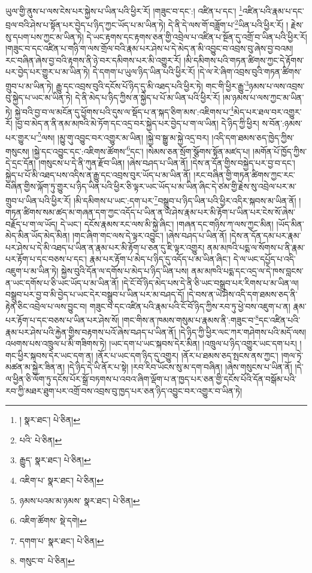 ཡུལ་གྱི་ནུས་པ་ལས་ངེས་པར་སྐྱེས་པ་ཡིན་པའི་ཕྱིར་རོ། །གཟུང་བ་དང་:། འཛིན་པ་དང་། \footnote{།    སྣར་ཐང་།  པེ་ཅིན། }འཛིན་པའི་རྣམ་པ་དང་བྲལ་བའི་ཤེས་པ་སྟོན་པར་བྱེད་པ་ཉིད་ཀྱང་ཡོད་པ་མ་ཡིན་ཏེ། དེ་ནི་དེ་ལས་གོ་བཟློག་པ་\footnote{པའི་  པེ་ཅིན། }ཡིན་པའི་ཕྱིར་རོ། །
རྗེས་སུ་དཔག་པས་ཀྱང་མ་ཡིན་ཏེ། དེ་ཡང་རྟགས་དང་རྟགས་ཅན་གྱི་འབྲེལ་པ་འཛིན་པ་སྔོན་དུ་འགྲོ་བ་ཡིན་པའི་ཕྱིར་རོ། །གཟུང་བ་དང་འཛིན་པ་གཉི་ག་ལས་གྲོལ་བའི་རྣམ་པར་ཤེས་པ་དེ་མེད་ན་མི་འབྱུང་བ་འབྲས་བུ་ཞེས་བྱ་བའམ། རང་བཞིན་ཞེས་བྱ་བའི་རྟགས་ནི་ཉེ་བར་དམིགས་པར་མི་འགྱུར་རོ། །མི་དམིགས་པའི་གཏན་ཚིགས་ཀྱང་དེ་རྟོགས་པར་བྱེད་པར་གྱུར་པ་མ་ཡིན་ཏེ། དེ་དགག་པ་ཡུལ་ཉིད་ཡིན་པའི་ཕྱིར་རོ། །དེ་ལ་རེ་ཞིག་འབྲས་བུའི་གཏན་ཚིགས་གྲུབ་པ་མ་ཡིན་ཏེ། རྒྱུ་དང་འབྲས་བུའི་དངོས་པོ་ཉིད་དུ་མི་འཐད་པའི་ཕྱིར་ཏེ། གང་གི་ཕྱིར་རྒྱུ་\footnote{རྒྱུད་  སྣར་ཐང་།  པེ་ཅིན། }ཉམས་པ་ལས་འབྲས་བུ་སྐྱེད་པ་ཡང་མ་ཡིན་ཏེ། དེ་ནི་མེད་པ་ཉིད་ཀྱིས་ན་སྐྱེད་པ་པོ་མ་ཡིན་པའི་ཕྱིར་རོ། །མ་ཉམས་པ་ལས་ཀྱང་མ་ཡིན་ཏེ། སྐྱེ་བའི་བྱ་བ་ལ་མངོན་དུ་ཕྱོགས་པའི་དུས་ལ་སྡོད་པ་ན་སྐད་ཅིག་མས་:འཇིགས་པ་\footnote{འཇིག་པ་  སྣར་ཐང་།  པེ་ཅིན། }མེད་པར་ཐལ་བར་འགྱུར་རོ། །བྱ་བ་མེད་ན་ནི་ནམ་མཁའི་མེ་ཏོག་དང་འདྲ་བར་སྐྱེད་པར་བྱེད་པ་ག་ལ་ཡིན། དེ་ཉིད་ཀྱི་ཕྱིར། ས་བོན་:ཉམས་པར་གྱུར་པ་\footnote{ཉམས་པའམ་མ་ཉམས་  སྣར་ཐང་།  པེ་ཅིན། }ལས། །མྱུ་གུ་འབྱུང་བར་འགྱུར་མ་ཡིན། །སྐྱེ་བ་སྒྱུ་མ་སྐྱེ་འདྲ་བར། །འདི་དག་ཐམས་ཅད་ཁྱེད་ཀྱིས་གསུངས། །སྐྱེ་དང་འབྱུང་དང་:འཇིགས་ཚོགས་\footnote{འཇིག་ཚོགས་  སྡེ་དགེ། }དང་། །སེམས་ཅན་སྲོག་སྩོགས་སྟོན་མཛད་པ། །མགོན་པོ་ཁྱོད་ཀྱིས་དེ་དྲང་དོན། །གསུངས་པ་དེ་ནི་ཀུན་རྫོབ་ཡིན། །ཞེས་བཤད་པ་ཡིན་ནོ། །དེས་ན་དོན་གྱིས་བསྐྱེད་པར་བྱ་བ་དང་། སྐྱེད་པ་པོ་མི་འཐད་པས་འདིས་ན་རྒྱུ་དང་འབྲས་བུར་ཡོད་པ་མ་ཡིན་ནོ། །རང་བཞིན་གྱི་གཏན་ཚིགས་ཀྱང་རང་བཞིན་གྱིས་ལྐོག་ཏུ་གྱུར་པ་ཉིད་ཡིན་པའི་ཕྱིར་ཅི་ལྟར་ཡང་ཡོད་པ་མ་ཡིན་ཞིང་དེ་ཙམ་གྱི་རྗེས་སུ་འབྲེལ་པར་མ་གྲུབ་པ་ཡིན་པའི་ཕྱིར་རོ། །མི་དམིགས་པ་ཡང་:དག་པར་\footnote{དགག་པ་  སྣར་ཐང་།  པེ་ཅིན། }བསྒྲུབ་པ་ཉིད་ཡིན་པའི་ཕྱིར་འདིར་སྐབས་མ་ཡིན་ནོ། །གཏན་ཚིགས་སམ་ཚད་མ་གཞན་དག་ཀྱང་འདོད་པ་ཡིན་ན་ཡེ་ཤེས་རྣམ་པར་མི་རྟོག་པ་ཡིན་པར་ངེས་སོ་ཞེས་བརྗོད་པ་ག་ལ་ཡོད། དེ་ཡང་། དངོས་རྣམས་རང་ལས་མི་སྐྱེ་ཞིང་། །གཞན་དང་གཉིས་ཀ་ལས་ཀྱང་མིན། །ཡོད་མིན་མེད་མིན་ཡོད་མེད་མིན། །གང་ཞིག་གང་ལས་དེ་ལྟར་འབྱུང་། །ཞེས་བཤད་པ་ཡིན་ནོ། །དེས་ན་དོན་དམ་པར་རྣམ་པར་ཤེས་པ་དེ་མི་འཐད་པ་ཡིན་ན་རྣམ་པར་མི་རྟོག་པ་ཅན་དུ་ཇི་ལྟར་འགྱུར། ནམ་མཁའི་པདྨ་ལ་སོགས་པ་ནི་རྣམ་པར་རྟོག་པ་དང་བཅས་པ་དང་། རྣམ་པར་རྟོག་པ་མེད་པ་ཉིད་དུ་འདོད་པ་མ་ཡིན་ཞིང་། དེ་ལ་ཡང་དཔྱོད་པ་འདི་འཇུག་པ་མ་ཡིན་ཏེ། སྐྱེས་བུའི་དོན་ལ་དགོས་པ་མེད་པ་ཉིད་ཡིན་པས། ནམ་མཁའི་པདྨ་དང་འདྲ་ལ་དེ་ཁས་བླངས་ན་ཡང་དགོས་པ་ཅི་ཡང་ཡོད་པ་མ་ཡིན་ནོ། །དེ་ངོ་བོ་ཉིད་མེད་པས་དེ་ནི་ཅི་ཡང་བསྒྲུབ་པར་རིགས་པ་མ་ཡིན་ལ། བསྒྲུབ་པར་བྱ་བ་མི་བྱེད་པ་ཡང་དེར་བསྒྲུབ་པ་ཡིན་པར་མ་བཤད་དོ། །དེ་བས་ན་ཡེ་ཤེས་འདི་དག་ཐམས་ཅད་ནི་རྟེན་ཅིང་འབྲེལ་པ་ལས་བྱུང་བ། གཟུང་བ་དང་འཛིན་པའི་རྣམ་པའི་ངོ་བོ་ཉིད་ཀྱིས་རབ་ཏུ་ཕྱེ་བས་འཇུག་པ་ན། རྣམ་པར་རྟོག་པ་དང་བཅས་པ་ཡིན་པར་ཤེས་སོ། །གང་གིས་ན་ཁམས་གསུམ་པ་རྣམས་ནི་:གཟུང་བ་\footnote{གསུང་བ་  པེ་ཅིན། }དང་འཛིན་པའི་རྣམ་པར་ཤེས་པའི་རྐྱེན་གྱིས་བརྟགས་པའོ་ཞེས་བཤད་པ་ཡིན་ནོ། །དེ་ཉིད་ཀྱི་ཕྱིར་ལང་ཀར་གཤེགས་པའི་མདོ་ལས། འཕགས་པས་འཁྲུལ་པ་མི་གཟིགས་ཏེ། །ཡང་དག་པ་ཡང་སྐབས་དེར་མིན། །འཁྲུལ་པ་ཉིད་འགྱུར་ཡང་དག་པར། །གང་ཕྱིར་སྐབས་དེར་ཡང་དག་ན། །ནོར་པ་ཡང་དག་ཉིད་དུ་འགྱུར། །ནོར་པ་ཐམས་ཅད་སྤངས་ནས་ཀྱང་། །གལ་ཏེ་མཚན་མ་སྐྱེར་ཟིན་ན། །དེ་ཉིད་དེ་ཡི་ནོར་པ་སྟེ། །རབ་རིབ་ཡོངས་སུ་མ་དག་བཞིན། །ཞེས་གསུངས་པ་ཡིན་ནོ། །དེ་ལ་ཕྱིན་ཅི་ལོག་ཏུ་དངོས་པོར་སྒྲོ་བཏགས་པ་འབའ་ཞིག་ལྡོག་པ་ན་ཁྱད་པར་ཅན་གྱི་དངོས་པོའི་དོན་བསྒོམ་པའི་རབ་ཀྱི་མཐར་ཐུག་པར་འགྲོ་བས་འབྲས་བུ་ཁྱད་པར་ཅན་ཉིད་འབྱུང་བར་འགྱུར་བ་ཡིན་ཏེ། 